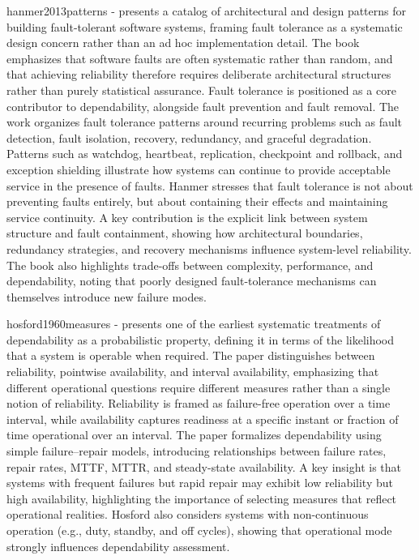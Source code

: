 hanmer2013patterns - presents a catalog of architectural and design patterns for building fault-tolerant software systems, framing fault tolerance as a systematic design concern rather than an ad hoc implementation detail. The book emphasizes that software faults are often systematic rather than random, and that achieving reliability therefore requires deliberate architectural structures rather than purely statistical assurance. Fault tolerance is positioned as a core contributor to dependability, alongside fault prevention and fault removal. The work organizes fault tolerance patterns around recurring problems such as fault detection, fault isolation, recovery, redundancy, and graceful degradation. Patterns such as watchdog, heartbeat, replication, checkpoint and rollback, and exception shielding illustrate how systems can continue to provide acceptable service in the presence of faults. Hanmer stresses that fault tolerance is not about preventing faults entirely, but about containing their effects and maintaining service continuity. A key contribution is the explicit link between system structure and fault containment, showing how architectural boundaries, redundancy strategies, and recovery mechanisms influence system-level reliability. The book also highlights trade-offs between complexity, performance, and dependability, noting that poorly designed fault-tolerance mechanisms can themselves introduce new failure modes.


hosford1960measures - presents one of the earliest systematic treatments of dependability as a probabilistic property, defining it in terms of the likelihood that a system is operable when required. The paper distinguishes between reliability, pointwise availability, and interval availability, emphasizing that different operational questions require different measures rather than a single notion of reliability. Reliability is framed as failure-free operation over a time interval, while availability captures readiness at a specific instant or fraction of time operational over an interval. The paper formalizes dependability using simple failure–repair models, introducing relationships between failure rates, repair rates, MTTF, MTTR, and steady-state availability. A key insight is that systems with frequent failures but rapid repair may exhibit low reliability but high availability, highlighting the importance of selecting measures that reflect operational realities. Hosford also considers systems with non-continuous operation (e.g., duty, standby, and off cycles), showing that operational mode strongly influences dependability assessment.


